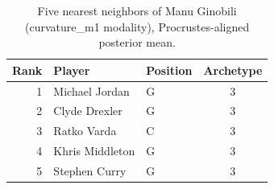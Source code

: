 \begin{table}[htbp]
  \centering\small
  \begin{tabular}{rllc}
    \toprule
    Rank & Player & Position & Archetype \\
    \midrule
    1 & Michael Jordan & G & 3 \\
    2 & Clyde Drexler & G & 3 \\
    3 & Ratko Varda & C & 3 \\
    4 & Khris Middleton & G & 3 \\
    5 & Stephen Curry & G & 3 \\
    \bottomrule
  \end{tabular}
  \caption{Five nearest neighbors of Manu Ginobili (curvature_m1 modality), Procrustes-aligned posterior mean.}
  \label{tab:Manu_Ginobili_neighbors_curvature_m1}
\end{table}

